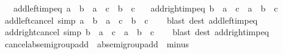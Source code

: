 \begin{isabellebody}
\ \ \ add{\isacharunderscore}{\kern0pt}left{\isacharunderscore}{\kern0pt}imp{\isacharunderscore}{\kern0pt}eq{\isacharcolon}{\kern0pt}\ {\isachardoublequoteopen}a\ {\isacharplus}{\kern0pt}\ b\ {\isacharequal}{\kern0pt}\ a\ {\isacharplus}{\kern0pt}\ c\ {\isasymLongrightarrow}\ b\ {\isacharequal}{\kern0pt}\ c{\isachardoublequoteclose}\isanewline
\ \ \ add{\isacharunderscore}{\kern0pt}right{\isacharunderscore}{\kern0pt}imp{\isacharunderscore}{\kern0pt}eq{\isacharcolon}{\kern0pt}\ {\isachardoublequoteopen}b\ {\isacharplus}{\kern0pt}\ a\ {\isacharequal}{\kern0pt}\ c\ {\isacharplus}{\kern0pt}\ a\ {\isasymLongrightarrow}\ b\ {\isacharequal}{\kern0pt}\ c{\isachardoublequoteclose}\isanewline
{}\isanewline
\isanewline
{}\isamarkupfalse%
\ add{\isacharunderscore}{\kern0pt}left{\isacharunderscore}{\kern0pt}cancel\ {\isacharbrackleft}{\kern0pt}simp{\isacharbrackright}{\kern0pt}{\isacharcolon}{\kern0pt}\ {\isachardoublequoteopen}a\ {\isacharplus}{\kern0pt}\ b\ {\isacharequal}{\kern0pt}\ a\ {\isacharplus}{\kern0pt}\ c\ {\isasymlongleftrightarrow}\ b\ {\isacharequal}{\kern0pt}\ c{\isachardoublequoteclose}\isanewline
%
\isadelimproof
\ \ %
\endisadelimproof
%
\isatagproof
{}\isamarkupfalse%
\ {\isacharparenleft}{\kern0pt}blast\ dest{\isacharcolon}{\kern0pt}\ add{\isacharunderscore}{\kern0pt}left{\isacharunderscore}{\kern0pt}imp{\isacharunderscore}{\kern0pt}eq{\isacharparenright}{\kern0pt}%
\endisatagproof
{\isafoldproof}%
%
\isadelimproof
\isanewline
%
\endisadelimproof
\isanewline
{}\isamarkupfalse%
\ add{\isacharunderscore}{\kern0pt}right{\isacharunderscore}{\kern0pt}cancel\ {\isacharbrackleft}{\kern0pt}simp{\isacharbrackright}{\kern0pt}{\isacharcolon}{\kern0pt}\ {\isachardoublequoteopen}b\ {\isacharplus}{\kern0pt}\ a\ {\isacharequal}{\kern0pt}\ c\ {\isacharplus}{\kern0pt}\ a\ {\isasymlongleftrightarrow}\ b\ {\isacharequal}{\kern0pt}\ c{\isachardoublequoteclose}\isanewline
%
\isadelimproof
\ \ %
\endisadelimproof
%
\isatagproof
{}\isamarkupfalse%
\ {\isacharparenleft}{\kern0pt}blast\ dest{\isacharcolon}{\kern0pt}\ add{\isacharunderscore}{\kern0pt}right{\isacharunderscore}{\kern0pt}imp{\isacharunderscore}{\kern0pt}eq{\isacharparenright}{\kern0pt}%
\endisatagproof
{\isafoldproof}%
%
\isadelimproof
\isanewline
%
\endisadelimproof
\isanewline
{}\isamarkupfalse%
\isanewline
\isanewline
{}\isamarkupfalse%
\ cancel{\isacharunderscore}{\kern0pt}ab{\isacharunderscore}{\kern0pt}semigroup{\isacharunderscore}{\kern0pt}add\ {\isacharequal}{\kern0pt}\ ab{\isacharunderscore}{\kern0pt}semigroup{\isacharunderscore}{\kern0pt}add\ {\isacharplus}{\kern0pt}\ minus\ {\isacharplus}{\kern0pt}\isanewline

\end{isabellebody}
